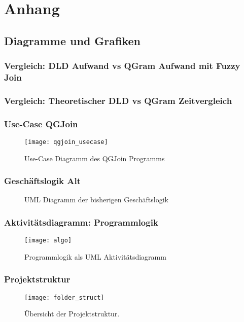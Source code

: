 \section{Anhang}
\subsection{Diagramme und Grafiken}
\subsubsection{Vergleich: DLD Aufwand vs QGram Aufwand mit Fuzzy Join}
\subsubsection{Vergleich: Theoretischer DLD vs QGram Zeitvergleich }
\subsubsection{Use-Case QGJoin}
\begin{figure}
	\label{fig:qgjoinUseCase}
	\caption{Use-Case Diagramm des QGJoin Programms}
	\texttt{[image: qgjoin\_usecase]}
\end{figure}
\subsubsection{Geschäftslogik Alt}
\begin{figure}
	\label{fig:geschäftslogikAlt}
	\caption{UML Diagramm der bisherigen Geschäftslogik}
\end{figure}







\subsubsection{Aktivitätsdiagramm: Programmlogik}
\begin{figure}[!htp]
	\caption{Programmlogik als UML Aktivitätsdiagramm}
	\label{fig:programmlogik}
	\texttt{[image: algo]}
	\centering
\end{figure}

\subsubsection{Projektstruktur}
\begin{figure}[!htp]
	\label{fig:folderstruct}
	\caption{Übersicht der Projektstruktur.}
	\texttt{[image: folder\_struct]}
\end{figure}

